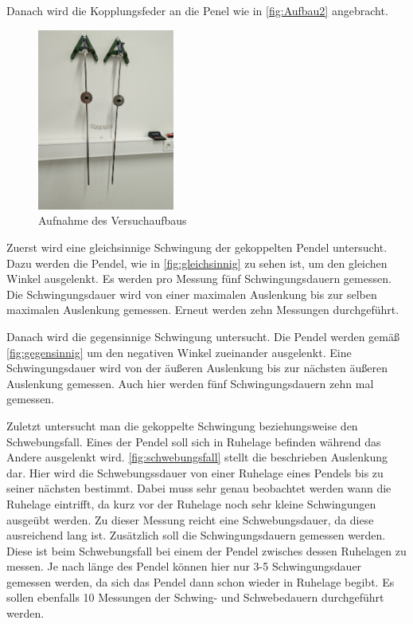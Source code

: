 Danach wird die Kopplungsfeder an die Penel wie in \autoref{fig:Aufbau2} angebracht. 
\begin{figure}
    \centering
    \includegraphics[width=0.4\textwidth]{content/Gekoppelt.jpg}
	\caption{Aufnahme des Versuchaufbaus}
	\label{fig:Aufbau2}
\end{figure}
Zuerst wird eine gleichsinnige Schwingung der gekoppelten Pendel untersucht. Dazu werden die Pendel, wie in \autoref{fig:gleichsinnig} zu sehen ist, um den gleichen Winkel ausgelenkt.
Es werden pro Messung fünf Schwingungsdauern gemessen. Die Schwingungsdauer wird von einer maximalen Auslenkung bis zur selben maximalen Auslenkung gemessen. Erneut werden zehn
Messungen durchgeführt. 


Danach wird die gegensinnige Schwingung untersucht. Die Pendel werden gemäß \autoref{fig:gegensinnig} um den negativen Winkel zueinander ausgelenkt. Eine Schwingungsdauer wird von
der äußeren Auslenkung bis zur nächsten äußeren Auslenkung gemessen. Auch hier werden fünf Schwingungsdauern zehn mal gemessen. 


Zuletzt untersucht man die gekoppelte Schwingung beziehungsweise den Schwebungsfall. Eines der Pendel soll sich in Ruhelage befinden während das Andere ausgelenkt wird. 
\autoref{fig:schwebungsfall} stellt die beschrieben Auslenkung dar. Hier wird die Schwebungssdauer von einer Ruhelage eines Pendels bis zu seiner nächsten bestimmt. Dabei muss sehr
genau beobachtet werden wann die Ruhelage eintrifft, da kurz vor der Ruhelage noch sehr kleine Schwingungen ausgeübt werden. Zu dieser Messung reicht eine Schwebungsdauer, da diese
ausreichend lang ist. Zusätzlich soll die Schwingungsdauern gemessen werden. Diese ist beim Schwebungsfall bei einem der Pendel zwisches dessen Ruhelagen zu messen. Je nach länge 
des Pendel können hier nur 3-5 Schwingungsdauer gemessen werden, da sich das Pendel dann schon wieder in Ruhelage begibt. Es sollen ebenfalls 10 Messungen der Schwing- und Schwebedauern
durchgeführt werden. 